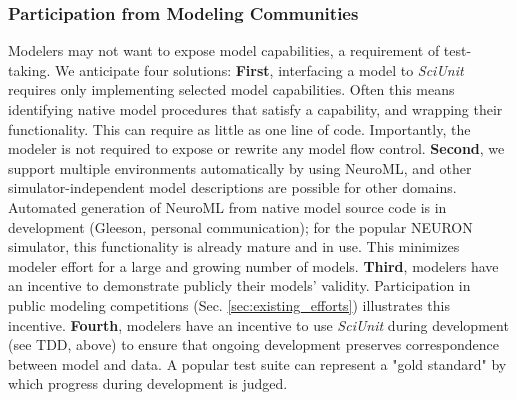 \documentclass[11pt,letterpaper]{article}
\begin{document}
\subsubsection{Participation from Modeling Communities}
Modelers may not want to expose model capabilities, a requirement of test-taking.  We anticipate four solutions: \textbf{First}, interfacing a model to \textit{SciUnit} requires only implementing selected model capabilities.  Often this means identifying native model procedures that satisfy a capability, and wrapping their functionality.  This can require as little as one line of code.  Importantly, the modeler is not required to expose or rewrite any model flow control.  \textbf{Second}, we support multiple environments automatically by using NeuroML\cite{gleeson_neuroml:_2010}, and other simulator-independent model descriptions are possible for other domains. Automated generation of NeuroML from native model source code is in development (Gleeson, personal communication); for the popular NEURON simulator, this functionality is already mature and in use.  This minimizes modeler effort for a large and growing number of models.  \textbf{Third}, modelers have an incentive to demonstrate publicly their models' validity.  Participation in public modeling competitions (Sec. \ref{sec:existing_efforts}) illustrates this incentive.  \textbf{Fourth}, modelers have an incentive to use \textit{SciUnit} during development (see TDD, above) to ensure that ongoing development preserves correspondence between model and data.  A popular test suite can represent a "gold standard" by which progress during development is judged.
\end{document}

